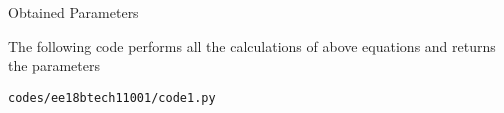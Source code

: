 \begin{enumerate}[label=\thesection.\arabic*.,ref=\thesection.\theenumi]
\begin{table}[!ht]
\centering

\caption{Obtained Parameters}
\label{table:ee18btech11001_params}
\end{table}

The following code performs all the calculations of above equations and returns the parameters 
\begin{lstlisting}
codes/ee18btech11001/code1.py
\end{lstlisting}


\end{enumerate}